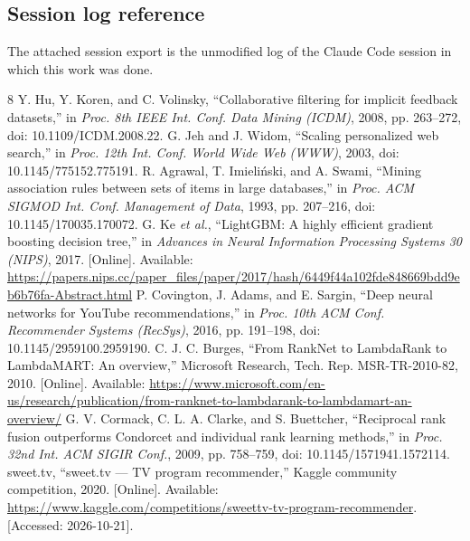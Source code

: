 \documentclass[conference]{IEEEtran}
\begin{document}
\subsection{Session log reference}
The attached session export is the unmodified log of the Claude Code session in which this work was done.

\begin{thebibliography}{8}
 Y. Hu, Y. Koren, and C. Volinsky, ``Collaborative filtering for implicit feedback datasets,'' in \emph{Proc. 8th IEEE Int. Conf. Data Mining (ICDM)}, 2008, pp. 263--272, doi: 10.1109/ICDM.2008.22.
 G. Jeh and J. Widom, ``Scaling personalized web search,'' in \emph{Proc. 12th Int. Conf. World Wide Web (WWW)}, 2003, doi: 10.1145/775152.775191.
 R. Agrawal, T. Imieli\'nski, and A. Swami, ``Mining association rules between sets of items in large databases,'' in \emph{Proc. ACM SIGMOD Int. Conf. Management of Data}, 1993, pp. 207--216, doi: 10.1145/170035.170072.
 G. Ke \emph{et al.}, ``LightGBM: A highly efficient gradient boosting decision tree,'' in \emph{Advances in Neural Information Processing Systems 30 (NIPS)}, 2017. [Online]. Available: \url{https://papers.nips.cc/paper_files/paper/2017/hash/6449f44a102fde848669bdd9eb6b76fa-Abstract.html}
 P. Covington, J. Adams, and E. Sargin, ``Deep neural networks for YouTube recommendations,'' in \emph{Proc. 10th ACM Conf. Recommender Systems (RecSys)}, 2016, pp. 191--198, doi: 10.1145/2959100.2959190.
 C. J. C. Burges, ``From RankNet to LambdaRank to LambdaMART: An overview,'' Microsoft Research, Tech. Rep. MSR-TR-2010-82, 2010. [Online]. Available: \url{https://www.microsoft.com/en-us/research/publication/from-ranknet-to-lambdarank-to-lambdamart-an-overview/}
 G. V. Cormack, C. L. A. Clarke, and S. Buettcher, ``Reciprocal rank fusion outperforms Condorcet and individual rank learning methods,'' in \emph{Proc. 32nd Int. ACM SIGIR Conf.}, 2009, pp. 758--759, doi: 10.1145/1571941.1572114.
 sweet.tv, ``sweet.tv --- TV program recommender,'' Kaggle community competition, 2020. [Online]. Available: \url{https://www.kaggle.com/competitions/sweettv-tv-program-recommender}. [Accessed: 2026-10-21].
\end{thebibliography}
\end{document}
